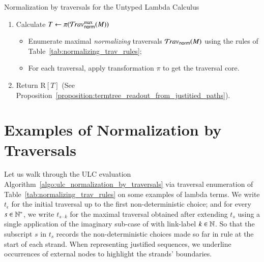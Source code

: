 \documentclass{elsarticle}
\theoremstyle{plain}
\theoremstyle{definition}
\newcommand{\normalizing}{{\sf norm}}
\newcommand{\travsetnorm}{\travset_\normalizing} %
\def\readout{\mathrm{R}} %
\def\coresymbol{\pi} %
\newcommand{\core}[1]{\coresymbol(#1)} %
\begin{document}
\begin{algorithm}%
\begin{algorithmic}
\caption{Normalization by traversals for the Untyped Lambda Calculus}
\label{algo:ulc_normalization_by_traversals}
\begin{enumerate}[nosep]
  \item Calculate $T \leftarrow \core{\travsetnorm^{\max}(M)}$
  \begin{itemize}[leftmargin=0.5em,nosep]
    \item Enumerate maximal \emph{normalizing} traversals $\travsetnorm(M)$ using the rules of Table~\ref{tab:normalizing_trav_rules};
    \item For each traversal, apply transformation $\coresymbol$ to get the traversal core.
  \end{itemize}
  \item Return $\readout[T]$ (See Proposition~\ref{proposition:termtree_readout_from_justitied_paths}).
\end{enumerate}
\end{algorithmic}
\end{algorithm}

\section{Examples of Normalization by Traversals}
\label{sec:examples}
Let us walk through the ULC evaluation Algorithm~\ref{algo:ulc_normalization_by_traversals} via traversal enumeration of Table~\ref{tab:normalizing_trav_rules} on some examples of lambda terms. We write $t_\epsilon$  for the initial traversal up to the first non-deterministic choice; and for every $s \in \mathbb{N}^*$, we write $t_{s \cdot k}$ for the maximal traversal obtained after extending $t_s$ using a single application of the imaginary sub-case of  with link-label $k \in \mathbb{N}$. So that the subscript $s$ in $t_s$ records the non-deterministic choices made so far in rule 
at the start of each strand.
When representing justified sequences, we underline occurrences of external nodes to highlight the strands' boundaries.
\end{document}
